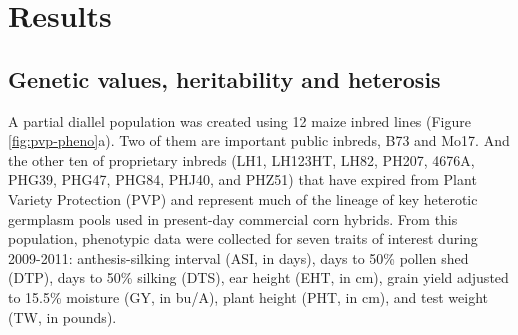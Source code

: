\documentclass[9pt,twocolumn,twoside]{gsajnl}
\begin{document}
\section*{Results}


\subsection*{Genetic values, heritability and heterosis}

A partial diallel population was created using 12 maize inbred lines (Figure \ref{fig:pvp-pheno}a). 
Two of them are important public inbreds, B73 and Mo17. And the other ten of proprietary inbreds (LH1, LH123HT, LH82, PH207, 4676A, PHG39, PHG47, PHG84, PHJ40, and PHZ51) that have expired from Plant Variety Protection (PVP) and represent much of the lineage of key heterotic germplasm pools used in present-day commercial corn hybrids. 
From this population, phenotypic data were collected for seven traits of interest during 2009-2011: anthesis-silking interval (ASI, in days), days to 50\% pollen shed (DTP), days to 50\% silking (DTS), ear height (EHT, in cm), grain yield adjusted to 15.5\% moisture (GY, in bu/A), plant height (PHT, in cm), and test weight (TW, in pounds).
\end{document}
